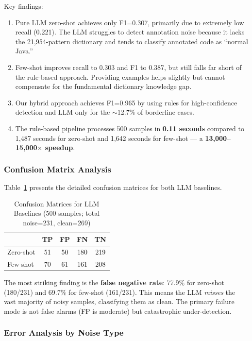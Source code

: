 \documentclass[acmlarge,nonacm,screen]{acmart}
\begin{document}
Key findings:
\begin{enumerate}
    \item Pure LLM zero-shot achieves only F1=0.307, primarily due to extremely low recall (0.221). The LLM struggles to detect annotation noise because it lacks the 21,954-pattern dictionary and tends to classify annotated code as ``normal Java.''
    \item Few-shot improves recall to 0.303 and F1 to 0.387, but still falls far short of the rule-based approach. Providing examples helps slightly but cannot compensate for the fundamental dictionary knowledge gap.
    \item Our hybrid approach achieves F1=0.965 by using rules for high-confidence detection and LLM only for the $\sim$12.7\% of borderline cases.
    \item The rule-based pipeline processes 500 samples in \textbf{0.11 seconds} compared to 1,487 seconds for zero-shot and 1,642 seconds for few-shot --- a \textbf{13,000--15,000$\times$ speedup}.
\end{enumerate}

\subsubsection{Confusion Matrix Analysis}

Table~\ref{tab:confusion} presents the detailed confusion matrices for both LLM baselines.

\begin{table}[htbp]
\caption{Confusion Matrices for LLM Baselines (500 samples; total noise=231, clean=269)}
\label{tab:confusion}
\begin{tabular}{@{}lcccc@{}}
\toprule
 & \textbf{TP} & \textbf{FP} & \textbf{FN} & \textbf{TN} \\
\midrule
Zero-shot & 51 & 50 & 180 & 219 \\
Few-shot & 70 & 61 & 161 & 208 \\
\bottomrule
\end{tabular}
\end{table}

The most striking finding is the \textbf{false negative rate}: 77.9\% for zero-shot (180/231) and 69.7\% for few-shot (161/231). This means the LLM \textit{misses} the vast majority of noisy samples, classifying them as clean. The primary failure mode is not false alarms (FP is moderate) but catastrophic under-detection.

\subsubsection{Error Analysis by Noise Type}
\end{document}
